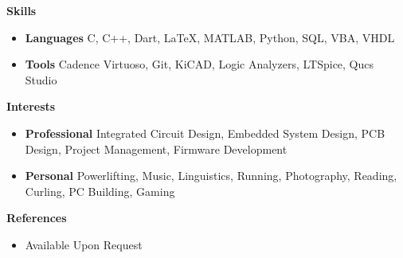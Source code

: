 \documentclass[letterpaper,12pt]{article}[leftmargin=*]
\def \entryspacing {-0pt}
\renewcommand{\section}[2]{\vspace{5pt}
  \colorbox{secondary}{\color{white}\raggedbottom\normalsize\textbf{{#1}{\hspace{7pt}#2}}}
}
\newcommand{\resumeEntryStart}{\begin{itemize}[leftmargin=2.5mm]}
\newcommand{\resumeEntryEnd}{\end{itemize}\vspace{\entryspacing}}
\newcommand{\resumeEntryS}[2]{
  \item[]\small{
    \textbf{\color{primary}#1 }{ #2 \vspace{-6pt}}
  }
}
\begin{document}
\section{\faGears}{Skills}

 \resumeEntryStart
  \resumeEntryS{Languages } {C, C++, Dart, LaTeX, MATLAB, Python, SQL, VBA, VHDL}
  \resumeEntryS{Tools } {Cadence Virtuoso, Git, KiCAD, Logic Analyzers, LTSpice, Qucs Studio}
 \resumeEntryEnd

\section{\faGamepad}{Interests}

 \resumeEntryStart
  \resumeEntryS{Professional }{Integrated Circuit Design, Embedded System Design, PCB Design, Project Management, Firmware Development}
  \resumeEntryS{Personal }{Powerlifting, Music, Linguistics, Running, Photography, Reading, Curling, PC Building, Gaming}
 \resumeEntryEnd
\section{\faEnvelope}{References}

 \resumeEntryStart
  \resumeEntryS{}{Available Upon Request}
 \resumeEntryEnd
\end{document}
